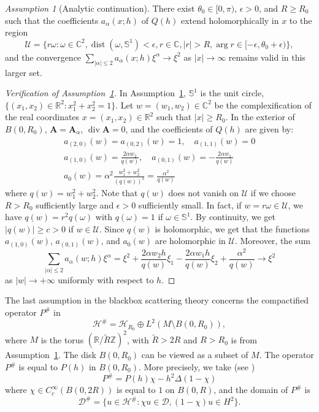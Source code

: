 \documentclass[11pt]{amsart}
\theoremstyle{remark}
\newtheorem{assumption}[theorem]{Assumption}
\newcommand{\bA}{\mathbf{A}}
\newcommand{\R}{\mathbb{R}}
\DeclareMathOperator{\Div}{div}
\numberwithin{equation}{section}
\begin{document}
\begin{assumption}[Analytic continuation]\label{Ass:AC}
There exist $\theta_0 \in [0,\pi)$, $\epsilon > 0$, and $R \geq R_0$ such that the coefficients $a_\alpha(x;h)$ of $Q(h)$ extend holomorphically in $x$ to the region
\[
\mathcal U=\{r\omega : \omega \in \mathbb{C}^2, \operatorname{dist}(\omega, \mathbb S^1) < \epsilon, r \in \mathbb{C}, |r| > R, \arg r \in [-\epsilon, \theta_0 + \epsilon)\},
\]
and the convergence $\sum_{|\alpha| \leq 2} a_\alpha(x;h)\xi^\alpha \to \xi^2$ as $|x| \to \infty$ remains valid in this larger set.
\end{assumption}

\begin{proof}[Verification of Assumption~\ref{Ass:AC}]
In Assumption~\ref{Ass:AC}, $\mathbb S^1$ is the unit circle, $\{(x_1,x_2)\in\R^2\colon x_1^2+x_2^2=1\}$. Let $w = (w_1, w_2) \in \mathbb{C}^2$ be the complexification of the real coordinates $x = (x_1, x_2) \in \R^2$ such that $|x|\geq  R_0$. In the exterior of $B(0,R_0)$, $\bA=\bA_\alpha$, $\Div\bA=0$, and the coefficients of $Q(h)$ are given by:
\[\begin{gathered}
    a_{(2,0)}(w) = a_{(0,2)}(w) = 1, \quad a_{(1,1)}(w) = 0 \\
    a_{(1,0)}(w)  = \frac{2\alpha w_2}{q(w)},\quad 
    a_{(0,1)}(w)  = -\frac{ 2\alpha w_1}{q(w)} \\
    a_0(w) = \alpha^2\frac{w_1^2 + w_2^2}{(q(w))^2} = \frac{\alpha^2}{q(w)}
\end{gathered}\]
where $q(w)=w_1^2+w_2^2$. Note that  $q(w)$ does not vanish on $\mathcal{U}$ if we choose $R>R_0$ sufficiently large and $\epsilon>0$ sufficiently small. In fact, if $w = r\omega \in \mathcal{U}$, we have $q(w) = r^2 q(\omega)$ with $q(\omega)=1$ if $\omega\in \mathbb S^1$. By continuity, we get $|q(w)|\geq c>0$ if $w\in\mathcal U$. Since $q(w)$ is holomorphic, we get that the functions $a_{(1,0)}(w)$, $a_{(0,1)}(w)$, and $a_0(w)$ are holomorphic in $\mathcal U$. Moreover, the sum 
\[\sum_{|\alpha|\leq 2}a_\alpha(w;h)\xi^\alpha=\xi^2+\frac{2\alpha w_2h}{q(w)}\xi_1-\frac{2\alpha w_1 h}{q(w)}\xi_2+\frac{\alpha^2}{q(w)}\to \xi^2\]
as $|w|\to+\infty$ uniformly with respect to $h$.\medskip
\end{proof}

The last assumption  in the blackbox scattering theory concerns the compactified operator $P^{\#}$ in 
\[\mathcal H^{\#}=\mathcal H_{R_0}\oplus L^2(M\setminus B(0,R_0)), \]
where $M$ is the torus $(\R/\tilde R\mathbb{Z})^2$, with $\tilde R>2R$ and $R>R_0$ is from Assumption~\ref{Ass:AC}. The disk $B(0,R_0)$ can be viewed as a subset of $M$. The operator $P^{\#}$ is equal to $P(h)$ in $B(0,R_0)$. More precisely, we take (see \cite[Remark 7.1]{SZ})
\[P^{\#}=P(h)\chi -h^2\Delta (1-\chi)\]
where $\chi\in C_c^{\infty}(B(0,2R))$ is equal to $1$ on $B(0,R)$, and  the domain of $P^{\#}$ is 
\[\mathcal D^{\#}=\{u\in\mathcal H^{\#}\colon \chi u\in \mathcal D,(1-\chi)u\in H^2\}.\]
\end{document}
